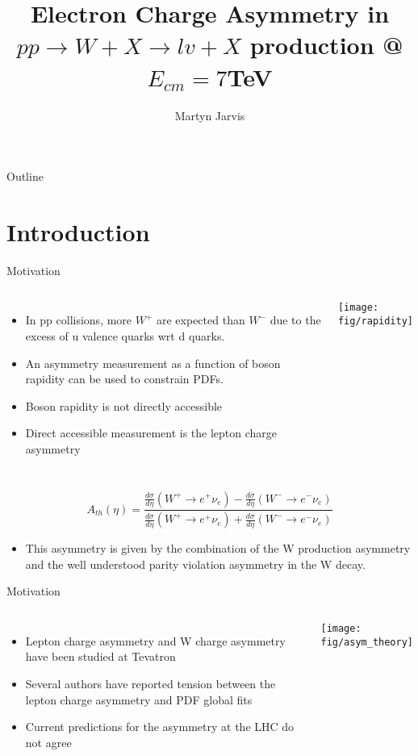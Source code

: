 \documentclass[t, 8pt]{beamer}
\author{Martyn Jarvis}
\title[Electron Charge Asymmetry]{Electron Charge Asymmetry in $pp \to W+X \to
lv + X$ production @ $E_{cm} = 7$TeV}
\begin{document}
\begin{frame}
  \titlepage
\end{frame}

\begin{frame}{Outline}
  \tableofcontents
\end{frame}

\section{Introduction}

\begin{frame}{Motivation}
  \begin{columns}[c]
  \begin{itemize}
    \item In pp collisions, more $W^+$ are expected than $W^-$ due to the excess of u valence quarks wrt d quarks.
    \item An asymmetry measurement as a function of boson rapidity can be used to constrain PDFs.
    \item Boson rapidity is not directly accessible
    \item Direct accessible measurement is the lepton charge asymmetry
  \end{itemize}
    \texttt{[image: fig/rapidity]}
  \end{columns}

    \begin{equation}
    A_{th}(\eta) = \frac{\frac{d\sigma}{d\eta}(W^{+}\to e^{+}\nu_{e}) - \frac{d\sigma}{d\eta}(W^{-}\to e^{-}\nu_{e})}
                        {\frac{d\sigma}{d\eta}(W^{+}\to e^{+}\nu_{e}) + \frac{d\sigma}{d\eta}(W^{-}\to e^{-}\nu_{e})}
    \end{equation}
  \begin{itemize}
    \item This asymmetry is given by the combination of the W production asymmetry and the well understood parity violation asymmetry in the W decay.
  \end{itemize}
\end{frame}

\begin{frame}{Motivation}
  \begin{columns}[c]
  \begin{itemize}
    \item Lepton charge asymmetry and W charge asymmetry have been studied at Tevatron
    \item Several authors have reported tension between the lepton charge asymmetry and PDF global fits
    \item Current predictions for the asymmetry at the LHC do not agree
  \end{itemize}
    \texttt{[image: fig/asym\_theory]}
  \end{columns}
\end{frame}
\end{document}
